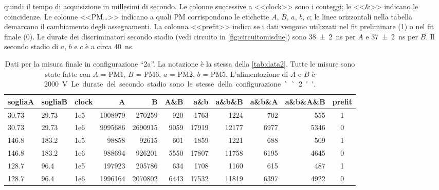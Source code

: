 \begin{landscape}
\begin{table}
{		quindi il tempo di acquisizione in millesimi di secondo.
		Le colonne successive a <<clock>> sono i conteggi; le <<\&>> indicano le coincidenze.
		Le colonne <<PM\dots>> indicano a quali PM corrispondono le etichette $A$, $B$, $a$, $b$, $c$;
		le linee orizzontali nella tabella demarcano il cambiamento degli assegnamenti.
		La colonna <<prefit>> indica se i dati vengono utilizzati nel fit preliminare (1) o nel fit finale (0).
		Le durate dei discriminatori secondo stadio (vedi circuito in \autoref{fig:circuitomisdue})
		sono \SI{38\pm2}{ns} per $A$ e \SI{37\pm2}{ns} per $B$.
		Il secondo stadio di $a$, $b$ e $c$ è a circa \SI{40}{ns}.}
	\end{table}
\end{landscape}

\begin{table}[h]
	\small
	\hspace{-5em}
	\begin{tabular}{ll|lrrrrrrr|c}
		sogliaA & sogliaB & clock & A & B & A\&B & a\&b & a\&b\&B & a\&b\&A & a\&b\&A\&B & prefit \\
		\hline
		30.73 & 29.73 & 1e5 & 1008979 & 270259 & 920 & 1763 & 1224 & 702 & 555  & 1               \\
		30.73 & 29.73 & 1e6 & 9995686 & 2690915 & 9059 & 17919 & 12177 & 6977 & 5346 & 0          \\
		146.8 & 183.2 & 1e5 & 98858 & 92615 & 601 & 1859 & 1221 & 688 & 509  & 1                    \\
		146.8 & 183.2 & 1e6 & 988694 & 926201 & 5550 & 17807 & 11758 & 6195 & 4645 & 0              \\
		128.7 & 96.4 & 1e5 & 197923 & 205786 & 634 & 1708 & 1160 & 615 & 487  & 1            \\
		128.7 & 96.4 & 1e6 & 1996164 & 2070802 & 6443 & 17532 & 11819 & 6397 & 4922 & 0      
	\end{tabular}
	\caption{\label{tab:data2a}
	Dati per la misura finale in configurazione ``2a''.
	La notazione è la stessa della \autoref{tab:data2}.
	Tutte le misure sono state fatte con $A$ = PM1, $B$ = PM6, $a$ = PM2, $b$ = PM5.
	L'alimentazione di $A$ e $B$ è \SI{2000}V.
	Le durate del secondo stadio sono le stesse della configurazione ``2''.}
\end{table}
\vspace{5em}

